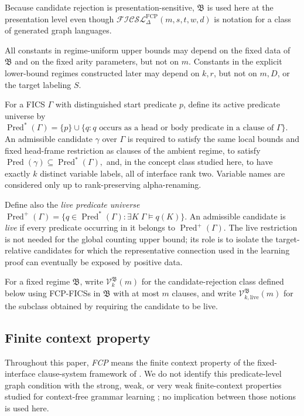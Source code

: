 \documentclass[11pt]{article}
\theoremstyle{definition}
\theoremstyle{remark}
\newcommand{\Pred}{\operatorname{Pred}}
\begin{document}
Because candidate rejection is presentation-sensitive, \(\mathfrak B\) is
used here at the presentation level even though
\(\mathcal{FICSL}^{\mathrm{FCP}}_{\Delta}(m,s,t,w,d)\) is notation for a
class of generated graph languages.

All constants in regime-uniform upper bounds may depend on the fixed data of
\(\mathfrak B\) and on the fixed arity parameters, but not on \(m\).
Constants in the explicit lower-bound regimes constructed later may depend on
\(k,r\), but not on \(m,D\), or the target labeling \(S\).

For a FICS \(\Gamma\) with distinguished start predicate \(p\), define its
active predicate universe by
\(\Pred^\ast(\Gamma) = \{p\} \cup \{q:q\text{ occurs as a head or body predicate in a clause of }\Gamma\}.\)
An admissible candidate \(\gamma\) over \(\Gamma\) is required to satisfy the
same local bounds and fixed head-frame restriction as clauses of the ambient
regime, to satisfy
\(\Pred(\gamma)\subseteq\Pred^\ast(\Gamma),\)
and, in the concept class studied here, to have exactly \(k\) distinct
variable labels, all of interface rank two. Variable names are considered only
up to rank-preserving alpha-renaming.

Define also the \emph{live predicate universe}
\(\Pred^+(\Gamma) = \{q\in\Pred^\ast(\Gamma):\exists K\;\Gamma\models q(K)\}.\)
An admissible candidate is \emph{live} if every predicate occurring in it
belongs to \(\Pred^+(\Gamma)\).  The live restriction is not needed for the
global counting upper bound; its role is to isolate the target-relative
candidates for which the representative connection used in the learning proof
can eventually be exposed by positive data.

For a fixed regime \(\mathfrak B\), write
\(\mathcal V_k^{\mathfrak B}(m)\)
for the candidate-rejection class defined below using FCP-FICSs in
\(\mathfrak B\) with at most \(m\) clauses, and write
\(\mathcal V_{k,\mathrm{live}}^{\mathfrak B}(m)\)
for the subclass obtained by requiring the candidate to be live.

\subsection{Finite context property}

Throughout this paper, \emph{FCP} means the finite context property of the
fixed-interface clause-system framework of \cite{ShoudaiEtAl2026}.  We do not
identify this predicate-level graph condition with the strong, weak, or very
weak finite-context properties studied for context-free grammar learning
\cite{KanazawaYoshinaka2017}; no implication between those notions is used
here.
\end{document}
